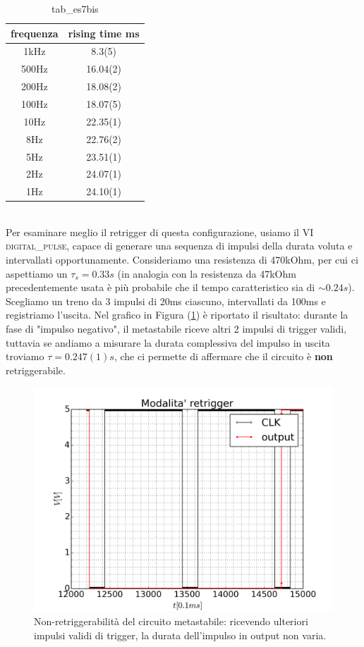 \documentclass[journal, a4paper]{IEEEtran}
\begin{document}
\begin{table}
\centering
\caption{tab\_es7bis}
\label{tab:es7bis}
{
\begin{tabular}{c|c}
\hline \textbf{frequenza} & \textbf{rising time} ms \\ 
\hline 1kHz & 8.3(5) \\ 
 500Hz & 16.04(2) \\ 
 200Hz & 18.08(2) \\ 
 100Hz & 18.07(5) \\ 
 10Hz & 22.35(1) \\ 
 8Hz & 22.76(2) \\
 5Hz & 23.51(1) \\
2Hz & 24.07(1) \\
1Hz & 24.10(1)\\ 
\hline 
\end{tabular}
}
\end{table}
~\\

Per esaminare meglio il retrigger di questa configurazione, usiamo il VI \textsc{digital\_pulse}, capace di generare una sequenza di impulsi della durata voluta e intervallati opportunamente. Consideriamo una resistenza di 470kOhm, per cui ci aspettiamo un $\tau_s = 0.33s$ (in analogia con la resistenza da 47kOhm precedentemente usata è più probabile che il tempo caratteristico sia di $\sim 0.24s$). Scegliamo un treno da 3 impulsi di 20ms ciascuno, intervallati da 100ms e registriamo l'uscita. Nel grafico in Figura (\ref{fig:es8_retrigger}) è riportato il risultato: durante la fase di "impulso negativo", il metastabile riceve altri 2 impulsi di trigger validi, tuttavia se andiamo a misurare la durata complessiva del impulso in uscita troviamo $\tau = 0.247(1)s$, che ci permette di affermare che il circuito è \textbf{non} retriggerabile.

\begin{figure}
\centering
\includegraphics[width=0.7\linewidth]{./es8_retrigger}
\caption{Non-retriggerabilità del circuito metastabile: ricevendo ulteriori impulsi validi di trigger, la durata dell'impulso in output non varia.}
\label{fig:es8_retrigger}
\end{figure}
\end{document}
